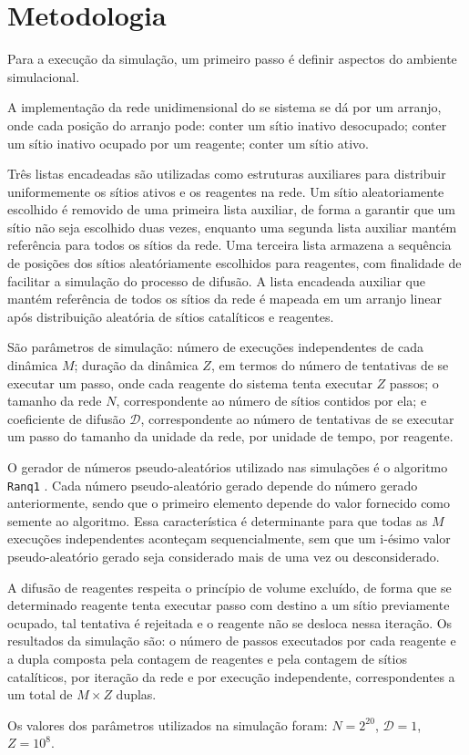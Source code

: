 
\section{Metodologia}

Para a execução da simulação, um primeiro passo é definir aspectos do ambiente
simulacional.

A implementação da rede unidimensional do se sistema se dá por um arranjo, onde
cada posição do arranjo pode: conter um sítio inativo desocupado; conter um
sítio inativo ocupado por um reagente; conter um sítio ativo.

Três listas encadeadas são utilizadas como estruturas auxiliares para
distribuir uniformemente os sítios ativos e os reagentes na rede. Um sítio
aleatoriamente escolhido é removido de uma primeira lista auxiliar, de forma a
garantir que um sítio não seja escolhido duas vezes, enquanto uma segunda lista
auxiliar mantém referência para todos os sítios da rede. Uma terceira lista
armazena a sequência de posições dos sítios aleatóriamente escolhidos para
reagentes, com finalidade de facilitar a simulação do processo de difusão. A
lista encadeada auxiliar que mantém referência de todos os sítios da rede é
mapeada em um arranjo linear após distribuição aleatória de sítios catalíticos e
reagentes.

São parâmetros de simulação: número de execuções independentes de cada dinâmica
$M$; duração da dinâmica $Z$, em termos do número de tentativas de se executar
um passo, onde cada reagente do sistema tenta executar $Z$ passos; o tamanho da
rede $N$, correspondente ao número de sítios contidos por ela; e coeficiente de
difusão $\mathcal{D}$, correspondente ao número de tentativas de se executar um
passo do tamanho da unidade da rede, por unidade de tempo, por reagente.

O gerador de números pseudo-aleatórios utilizado nas simulações é o algoritmo
\texttt{Ranq1} \cite{8}. Cada número pseudo-aleatório gerado depende do número
gerado anteriormente, sendo que o primeiro elemento depende do valor fornecido
como semente ao algoritmo. Essa característica é determinante para que todas as
$M$ execuções independentes aconteçam sequencialmente, sem que um i-ésimo valor
pseudo-aleatório gerado seja considerado mais de uma vez ou desconsiderado.

A difusão de reagentes respeita o princípio de volume excluído, de forma que se
determinado reagente tenta executar passo com destino a um sítio previamente
ocupado, tal tentativa é rejeitada e o reagente não se desloca nessa iteração.
Os resultados da simulação são: o número de passos executados por cada reagente
e a dupla composta pela contagem de reagentes e pela contagem de sítios
catalíticos, por iteração da rede e por execução independente, correspondentes a
um total de $M \times Z$ duplas.

Os valores dos parâmetros utilizados na simulação foram: $N = 2^{20}$,
$\mathcal{D} = 1$, $Z = 10^8$.
